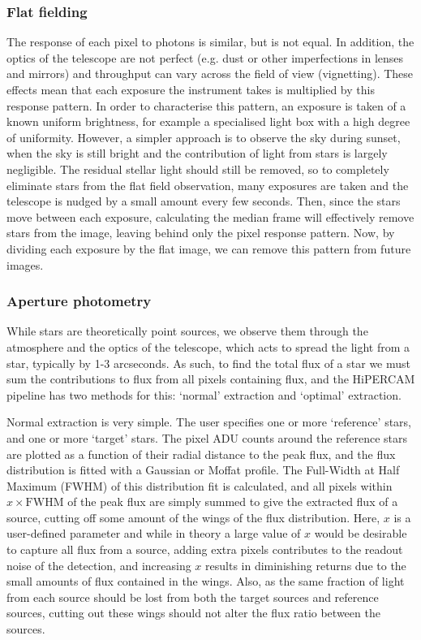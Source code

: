 \subsubsection{Flat fielding}

The response of each pixel to photons is similar, but is not equal. In addition, the optics of the telescope are not perfect (e.g. dust or other imperfections in lenses and mirrors) and throughput can vary across the field of view (vignetting). These effects mean that each exposure the instrument takes is multiplied by this response pattern.
In order to characterise this pattern, an exposure is taken of a known uniform brightness, for example a specialised light box with a high degree of uniformity. 
However, a simpler approach is to observe the sky during sunset, when the sky is still bright and the contribution of light from stars is largely negligible. 
The residual stellar light should still be removed, so to completely eliminate stars from the flat field observation, many exposures are taken and the telescope is nudged by a small amount every few seconds. Then, since the stars move between each exposure, calculating the median frame will effectively remove stars from the image, leaving behind only the pixel response pattern. 
Now, by dividing each exposure by the flat image, we can remove this pattern from future images. 


\subsubsection{Aperture photometry}

While stars are theoretically point sources, we observe them through the atmosphere and the optics of the telescope, which acts to spread the light from a star, typically by 1-3 arcseconds. As such, to find the total flux of a star we must sum the contributions to flux from all pixels containing flux, and the HiPERCAM pipeline has two methods for this: `normal' extraction and `optimal' extraction.

Normal extraction is very simple. The user specifies one or more `reference' stars, and one or more `target' stars. The pixel ADU counts around the reference stars are plotted as a function of their radial distance to the peak flux, and the flux distribution is fitted with a Gaussian or Moffat profile. The Full-Width at Half Maximum (FWHM) of this distribution fit is calculated, and all pixels within $x \times \mathrm{FWHM}$ of the peak flux are simply summed to give the extracted flux of a source, cutting off some amount of the wings of the flux distribution. Here, $x$ is a user-defined parameter and while in theory a large value of $x$ would be desirable to capture all flux from a source, adding extra pixels contributes to the readout noise of the detection, and increasing $x$ results in diminishing returns due to the small amounts of flux contained in the wings.
Also, as the same fraction of light from each source should be lost from both the target sources and reference sources, cutting out these wings should not alter the flux ratio between the sources.

